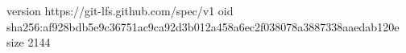 version https://git-lfs.github.com/spec/v1
oid sha256:af928bdb5e9c36751ac9ca92d3b012a458a6ec2f038078a3887338aaedab120e
size 2144
